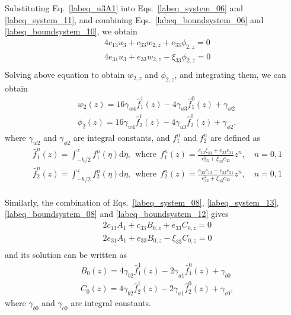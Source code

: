 \documentclass[12pt,sort&compress,fleqn,3p]{elsarticle}
\newcommand{\er}[4]{{#1}_{#2}{#3}_{#4}}
\newcommand{\de}[5]{{#1}_{#2}{#3}_{{#4},{#5}}}
\begin{document}
Substituting Eq.~\eqref{labeq_u3A1}  into Eqs.~\eqref{labeq_system_06} and \eqref{labeq_system_11}, and combining  Eqs.~\eqref{labeq_boundsystem_06} and  \eqref{labeq_boundsystem_10}, we obtain
\begin{equation}\label{labeq_w2phi2_z}
\begin{split}
&4\er{c}{13}{u}{3}+\de{c}{33}{w}{2}{z}+\de{e}{33}{\phi}{2}{z}=0\\
&4\er{e}{31}{u}{3}+\de{e}{33}{w}{2}{z}-\de{\xi}{33}{\phi}{2}{z}=0\\
\end{split}
\end{equation}
Solving above equation to obtain $w_{2,z}$ and $\phi_{2,z}$, and integrating them, we can obtain
\begin{equation}\label{labeq_w2phi2}
\begin{split}
&w_{2}(z)=16\gamma_{w4}\hat{f}^1_{1}(z)-4\gamma_{u3}\hat{f}^0_{1}(z)+\gamma_{w2}\\
&\phi_{2}(z)=16\gamma_{w4}\hat{f}^1_{2}(z)-4\gamma_{u3}\hat{f}^0_{2}(z)+\gamma_{\phi2},
\end{split}
\end{equation}
where $\gamma_{w2}$ and $\gamma_{\phi2}$ are integral constants, and $f^n_{1}$ and $f^n_{2}$ are defined as
\begin{equation}\label{labeq_f1nf2n}
\begin{split}
&  \hat{f}^n_{1}(z)  =  \int_{-h/2}^{z} f^n_{1}(\eta)  \mathrm{d} \eta,   ~~\text{where}~~ f^n_{1}(z)=\frac{\er{c}{13}{\xi}{33}+e_{33}e_{31}}{e_{33}^{2}+\xi_{33}c_{33}}z^{n},
\quad n=0,1\\
& \hat{f}^n_{2}(z) =  \int_{-h/2}^{z} f^n_{2}(\eta)   \mathrm{d}\eta,   ~~\text{where}~~  f^n_{2}(z)=\frac{e_{33}c_{13}-\er{c}{33}{e}{31}}{e_{33}^{2}+\xi_{33}c_{33}}z^{n},
\quad n=0,1\\
\end{split}
\end{equation}

Similarly, the combination of  Eqs.~\eqref{labeq_system_08}, \eqref{labeq_system_13}, \eqref{labeq_boundsystem_08} and \eqref{labeq_boundsystem_12} gives
\begin{equation}\label{labeq_B0C0_z}
\begin{split}
&2\er{c}{13}{A}{1}+\de{c}{33}{B}{0}{z}+\de{e}{33}{C}{0}{z}=0\\
&2\er{e}{31}{A}{1}+\de{e}{33}{B}{0}{z}-\de{\xi}{33}{C}{0}{z}=0\\
\end{split}
\end{equation}
and its solution can be written as
\begin{equation}\label{labeq_B0C0}
\begin{split}
&B_{0}(z)=4\gamma_{b2}\hat{f}^1_{1}(z)-2\gamma_{a1}\hat{f}^0_{1}(z)+\gamma_{b0}\\
&C_{0}(z)=4\gamma_{b2}\hat{f}^1_{2}(z)-2\gamma_{a1}\hat{f}^0_{2}(z)+\gamma_{c0},
\end{split}
\end{equation}
where $\gamma_{b0}$ and $\gamma_{c0}$ are integral constants.
\end{document}
